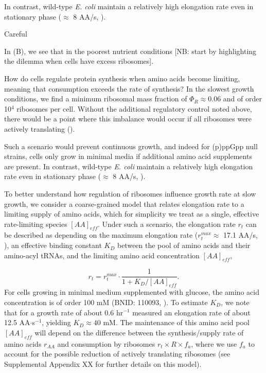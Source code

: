 In contrast, wild-type \textit{E. coli} maintain a relatively high
elongation rate even in stationary phase ($\approx$ 8 AA/s, \citep{dai2016,
dai2018}).

Careful


In \FIG{}(B), we see that in the poorest nutrient conditions
[NB: start by highlighting the dilemma when cells have excess ribosomes].

How do cells regulate protein synthesis when amino acids become limiting,
meaning that consumption exceeds the rate of synthesis? In the slowest  growth
conditions, we find a minimum ribosomal mass fraction of $\Phi_R \approx 0.06$
and  of order 10$^4$ ribosomes per cell.  Without the additional regulatory
control noted above, there would be a point where  this imbalance would occur if
all ribosomes were actively translating  ().

Such a
scenario would prevent continuous growth, and indeed for (p)ppGpp null strains,
cells only grow in minimal media if additional amino acid supplements are
present. In contrast, wild-type \textit{E. coli} maintain a relatively high
elongation rate even in stationary phase ($\approx$ 8 AA/s, \citep{dai2016,
dai2018}).

To better understand how regulation of ribosomes influence growth rate at
slow growth, we consider a coarse-grained model that relates elongation
rate to a limiting supply of amino acids, which for simplicity we treat as a
single, effective rate-limiting species $[AA]_{eff}$. Under such a scenario, the elongation
rate $r_t$ can be described as depending on the maximum elongation rate ($r_t^{max}
\approx$ 17.1 AA/s, \citep{dai2016, dai2018}), an effective binding constant
$K_D$ between the pool of amino acids and their amino-acyl tRNAs, and the limiting
amino acid concentration $[AA]_{eff}$,

\begin{equation}
r_t = r_t^{max} \cdot \frac{1}{1 + K_D / [AA]_{eff}}.
\label{eq:rate_Kd}
\end{equation}
For cells growing in minimal medium supplemented with glucose, the amino acid
concentration is of order 100 mM (BNID: 110093, \citep{milo2010, bennett2009}).
To estimate  $K_D$, we note that for a growth rate of about 0.6 hr$^{-1}$
\cite{dai2016} measured an elongation rate of about 12.5 AA$\cdot$s$^{-1}$,
yielding $K_D \approx 40$ mM. The maintenance of this amino acid pool
$[AA]_{eff}$ will depend on the difference between the synthesis/supply rate of
amino acids $r_{AA}$ and consumption by ribosomes $r_t \times R \times f_a$,
where we use $f_a$ to account for the possible reduction of actively translating
ribosomes (see Supplemental Appendix XX for further details on this model).

